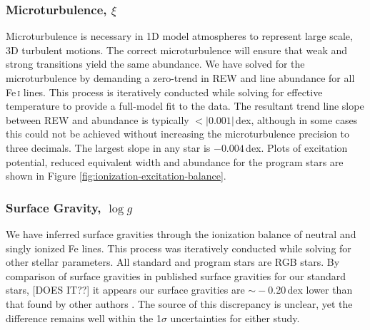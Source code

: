 \documentclass{emulateapj}
\begin{document}

\subsubsection{Microturbulence, $\xi$}
Microturbulence is necessary in 1D model atmospheres to represent large scale, 3D turbulent motions. The correct microturbulence will ensure that weak and strong transitions yield the same abundance. We have solved for the microturbulence by demanding a zero-trend in REW and line abundance for all Fe\,\textsc{i} lines. This process is iteratively conducted while solving for effective temperature to provide a full-model fit to the data. The resultant trend line slope between REW and abundance is typically $<|0.001|$\,dex, although in some cases this could not be achieved without increasing the microturbulence precision to three decimals. The largest slope in any star is $-0.004$\,dex. Plots of excitation potential, reduced equivalent width and abundance for the program stars are shown in Figure \ref{fig:ionization-excitation-balance}.



\subsubsection{Surface Gravity, $\log{g}$}
We have inferred surface gravities through the ionization balance of neutral and singly ionized Fe lines. This process was iteratively conducted while solving for other stellar parameters. All standard and program stars are RGB stars. By comparison of surface gravities in published surface gravities for our standard stars, [DOES IT??] it appears our surface gravities are $\sim{}-$0.20\,dex lower than that found by other authors \citep{gratton;et-al_2000,fulbright_2000,nissen;schuster_2000;gratton_sneden_1991}. The source of this discrepancy is unclear, yet the difference remains well within the 1$\sigma$ uncertainties for either study.
\end{document}

